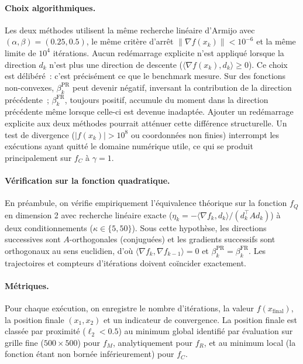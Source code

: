 \documentclass[10pt,a4paper]{article}
\begin{document}
\paragraph{Choix algorithmiques.} Les deux méthodes utilisent la même recherche linéaire d'Armijo avec $(\alpha, \beta) = (0.25, 0.5)$, le même critère d'arrêt $\|\nabla f(x_k)\| < 10^{-6}$ et la même limite de $10^4$ itérations. Aucun redémarrage explicite n'est appliqué lorsque la direction $d_k$ n'est plus une direction de descente ($\langle \nabla f(x_k), d_k \rangle \geq 0$). Ce choix est délibéré~: c'est précisément ce que le benchmark mesure. Sur des fonctions non-convexes, $\beta_k^{\text{PR}}$ peut devenir négatif, inversant la contribution de la direction précédente~; $\beta_k^{\text{FR}}$, toujours positif, accumule du moment dans la direction précédente même lorsque celle-ci est devenue inadaptée. Ajouter un redémarrage explicite aux deux méthodes pourrait atténuer cette différence structurelle. Un test de divergence ($|f(x_k)| > 10^8$ ou coordonnées non finies) interrompt les exécutions ayant quitté le domaine numérique utile, ce qui se produit principalement sur $f_C$ à $\gamma = 1$.

\paragraph{Vérification sur la fonction quadratique.} En préambule, on vérifie empiriquement l'équivalence théorique sur la fonction $f_Q$ en dimension 2 avec recherche linéaire exacte ($\eta_k = -\langle \nabla f_k, d_k\rangle / (d_k^\top A d_k)$) à deux conditionnements ($\kappa \in \{5, 50\}$). Sous cette hypothèse, les directions successives sont $A$-orthogonales (conjuguées) et les gradients successifs sont orthogonaux au sens euclidien, d'où $\langle \nabla f_k, \nabla f_{k-1}\rangle = 0$ et $\beta_k^{\text{PR}} = \beta_k^{\text{FR}}$. Les trajectoires et compteurs d'itérations doivent coïncider exactement.

\paragraph{Métriques.} Pour chaque exécution, on enregistre le nombre d'itérations, la valeur $f(x_{\text{final}})$, la position finale $(x_1, x_2)$ et un indicateur de convergence. La position finale est classée par proximité ($\ell_2 < 0.5$) au minimum global identifié par évaluation sur grille fine ($500 \times 500$) pour $f_M$, analytiquement pour $f_R$, et au minimum local (la fonction étant non bornée inférieurement) pour $f_C$.
\end{document}
